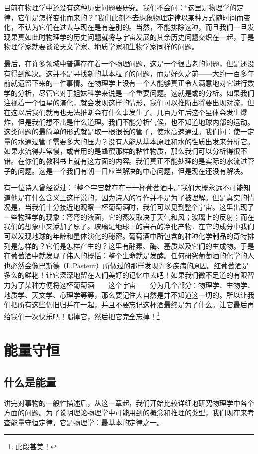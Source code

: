 \documentclass[12pt,oneside]{book}
\begin{document}
目前在物理学中还没有这种历史问题要研究。我们不会问：“这里是物理学的定律，它们是怎样变化而来的？”我们此刻不去想象物理定律以某种方式随时间而变化，不认为它们在过去与现在是有差别的。当然，不能排除这种，而且我们一旦发现果真如此时物理学的历史问题就将与宇宙发展的其余历史问题交织在一起，于是物理学家就要谈论天文学家、地质学家和生物学家同样的问题。

最后，在许多领域中普遍存在着一个物理问题，这是一个很古老的问题，但是还没有得到解决。这并不是寻找新的基本粒子的问题，而是好久之前——大约一百多年前就遗留下来的一件事情。在物理学上没有一个人能够真正令人满意地对它进行数学的分析，尽管它对于姐妹科学来说是一个重要问题。这就是或的分析。如果我们注视着一个恒星的演化，就会发现这样的情形，我们可以推断出将要出现对流，但在这以后我们就再也无法推断会有什么事发生了。几百万年后这个星体会发生爆炸，但是我们想不出是什么道理。我们不能分析气候，也不知道地球内部的运动。这类问题的最简单的形式就是取一根很长的管子，使水高速通过。我们问：使一定量的水通过管子需要多大的压力？没有人能从基本原理和水的性质出发来分析它。如果水流得非常慢，或者用的是蜂蜜那样的粘性物质，那么我们可以分析得很不错。在你们的教科书上就有这方面的内容。我们真正不能处理的是实际的水流过管子的问题。这是一个我们有朝一日应当解决的中心问题，但是现在还没有解决。

有一位诗人曾经说过：“整个宇宙就存在于一杯葡萄酒中。”我们大概永远不可能知道他是在什么含义上这样说的，因为诗人的写作并不是为了被理解。但是真实的情况是，当我们十分接近地观察一杯葡萄酒时，我们可以见到整个宁宙。这里出现了一些物理学的现象：弯弯的液面，它的蒸发取决于天气和风；玻璃上的反射；而在我们的想象中又添加了原子。玻璃足地球上的岩石的净化产物，在它的成分中我们可以发现地球的年龄和星体演化的秘密。葡萄酒中所包含的种种化学制品的奇特排列是怎样的？它们是怎样产生的？这里有酵素、酶、基质以及它们的生成物。于是在葡萄酒中就发现了伟人的概括：整个生命就是发酵。任何研究葡萄酒的化学的人也必然会像巴斯德（L.Pasteur）所做过的那样发现许多疾病的原因。红葡萄酒是多么的鲜艳！让它深深地留在人们美好的记忆中去吧！如果我们微不足道的有限智力为了某种方便将这杯葡萄酒——这个宇宙——分为几个部分：物理学、生物学、地质学、天文学、心理学等等，那么要记住大自然是并不知道这一切的。所以让我们把所有这些仍旧归并在一起，并且不要忘记这杯酒最终是为了什么。让它最后再给我们一次快乐吧！喝掉它，然后把它完全忘掉！\footnote{此段甚美！}



\chapter{能量守恒}
\section{什么是能量}
讲完对事物的一般性描述后，从这一章起，我们开始比较详细地研究物理学中各个方面的问题。为了说明理论物理学中可能用到的概念和推理的类型，我们现在来考查能量守恒定律，它是物理学：最基本的定律之一。
\end{document}
